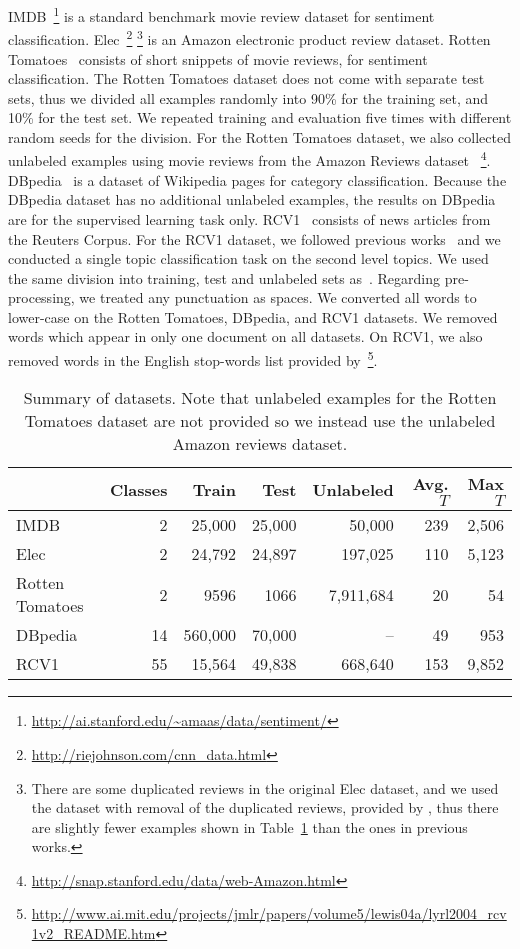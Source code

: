 \documentclass{article}
\begin{document}
IMDB~\cite[]{maas2011learning}\footnote{\url{http://ai.stanford.edu/~amaas/data/sentiment/}}
is a standard benchmark movie review dataset for sentiment classification.
Elec~\cite[]{johnson2015semi}\footnote{\url{http://riejohnson.com/cnn_data.html}}
\footnote{There are some duplicated reviews in the
original Elec dataset, and we used the dataset with removal of the duplicated
reviews, provided by \cite{johnson2015semi}, thus there are slightly fewer examples shown
in Table~\ref{tab:dataset}
than the ones in previous works\cite[]{johnson2015semi, johnson2016supervised}.}
is an Amazon electronic product review dataset.
Rotten Tomatoes~\cite[]{pang2005seeing} consists of short snippets of movie reviews,
for sentiment classification.
The Rotten Tomatoes dataset does not come with separate test sets, thus we divided all
examples randomly into 90\% for the training set, and 10\% for the test set. We repeated
training and evaluation five times with different random seeds for the division. 
For the Rotten Tomatoes dataset, we also collected
unlabeled examples using movie reviews from the Amazon Reviews dataset~\cite[]{mcauley2013hidden}
\footnote{\url{http://snap.stanford.edu/data/web-Amazon.html}}.
DBpedia~\cite[]{lehmann2015dbpedia, zhang2015character} is a dataset of Wikipedia pages for category
classification.
Because the
DBpedia dataset has no additional unlabeled examples, the results on DBpedia are for the
supervised learning task only.
RCV1~\cite[]{lewis2004rcv1} consists of news articles from the Reuters Corpus.
For the RCV1 dataset, we followed previous works~\cite[]{johnson2015semi} and we
conducted a single topic classification task on the second level topics.
We used the same division into training, test and unlabeled sets as~\citet{johnson2015semi}. 
Regarding pre-processing, we treated any punctuation as spaces.
We converted all words to lower-case on the Rotten Tomatoes, DBpedia, and RCV1
datasets.
We removed words which appear in only one document on all datasets.  
On RCV1, we also removed words in the English stop-words list provided by~\citet{lewis2004rcv1}\footnote{\url{http://www.ai.mit.edu/projects/jmlr/papers/volume5/lewis04a/lyrl2004_rcv1v2_README.htm}}.  
\begin{table}[ht]
  \centering
		\caption{\label{tab:dataset} Summary of datasets. Note that unlabeled
examples for the Rotten Tomatoes dataset are not provided so we instead use the unlabeled Amazon reviews 
dataset. }
\begin{tabular}{lrrrrrr}
			\toprule
			 & Classes & Train & Test & Unlabeled & Avg. $T$ & Max $T$ \\
			\midrule
			IMDB & 2 & 25,000 & 25,000 & 50,000 & 239 & 2,506 \\
			Elec & 2 & 24,792 & 24,897 & 197,025 & 110 & 5,123 \\
			Rotten Tomatoes & 2 & 9596 & 1066 & 7,911,684 & 20 & 54  \\
			DBpedia & 14 & 560,000 & 70,000 & -- & 49 & 953 \\
			RCV1  & 55 & 15,564 & 49,838 & 668,640 &153 & 9,852 \\
			\bottomrule
		\end{tabular}
\end{table}
\end{document}
